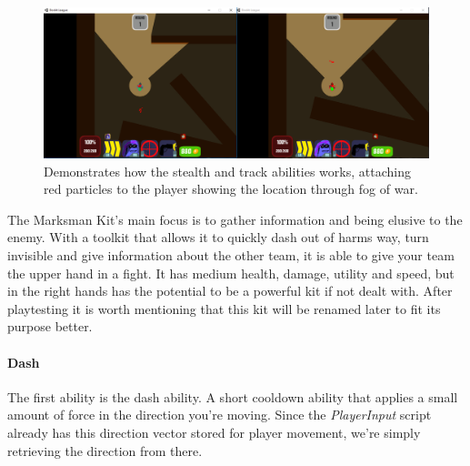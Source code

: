\begin{figure}[tbph]  %
  \centering
  \includegraphics[width=\textwidth]{images/MarksmanKit}
  \caption[Screenshot of Marksman Kit for both teams]{Demonstrates how the stealth and track abilities works, attaching red particles to the player showing the location through fog of war.}
  \label{fig:marksmanKit}
\end{figure}

The Marksman Kit's main focus is to gather information and being elusive to the enemy. With a toolkit that allows it to quickly dash out of harms way, turn invisible and give information about the other team, it is able to give your team the upper hand in a fight. It has medium health, damage, utility and speed, but in the right hands has the potential to be a powerful kit if not dealt with. After playtesting it is worth mentioning that this kit will be renamed later to fit its purpose better.

\paragraph{Dash}
The first ability is the dash ability. A short cooldown ability that applies a small amount of force in the direction you're moving. Since the \emph{PlayerInput} script already has this direction vector stored for player movement, we're simply retrieving the direction from there.

